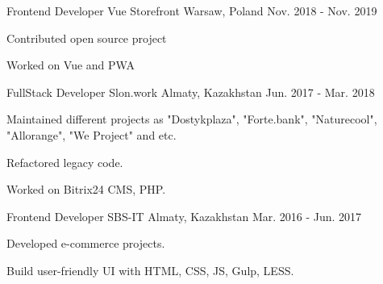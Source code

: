 \begin{cventries}
  \cventry
    {Frontend Developer} %
    {Vue Storefront} %
    {Warsaw, Poland} %
    {Nov. 2018 - Nov. 2019} %
    {
      \begin{cvitems} %
        \item {Contributed open source project}
        \item {Worked on Vue and PWA}
      \end{cvitems}
    }


  \cventry
    {FullStack Developer} %
    {Slon.work} %
    {Almaty, Kazakhstan} %
    {Jun. 2017 - Mar. 2018} %
    {
      \begin{cvitems} %
        \item {Maintained different projects as "Dostykplaza", "Forte.bank", "Naturecool", "Allorange", "We Project" and etc.}
        \item {Refactored legacy code.}
        \item {Worked on Bitrix24 CMS, PHP.}
      \end{cvitems}
    }

  \cventry
    {Frontend Developer} %
    {SBS-IT} %
    {Almaty, Kazakhstan} %
    {Mar. 2016 - Jun. 2017} %
    {
      \begin{cvitems} %
        \item {Developed e-commerce projects.}
        \item {Build user-friendly UI with HTML, CSS, JS, Gulp, LESS.}
      \end{cvitems}
    }


\end{cventries}
